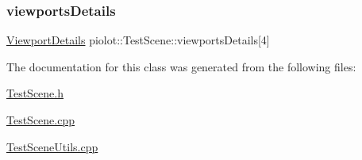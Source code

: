 \mbox{\label{classpiolot_1_1_test_scene_a0cbccb0354c0c68f277c2360cefc9ab7}} 
\subsubsection{\texorpdfstring{viewports\+Details}{viewportsDetails}}
{\footnotesize\ttfamily \mbox{\hyperlink{structpiolot_1_1_viewport_details}{Viewport\+Details}} piolot\+::\+Test\+Scene\+::viewports\+Details\mbox{[}4\mbox{]}\hspace{0.3cm}{\ttfamily [private]}}



The documentation for this class was generated from the following files\+:\begin{DoxyCompactItemize}
\item 
\mbox{\hyperlink{_test_scene_8h}{Test\+Scene.\+h}}\item 
\mbox{\hyperlink{_test_scene_8cpp}{Test\+Scene.\+cpp}}\item 
\mbox{\hyperlink{_test_scene_utils_8cpp}{Test\+Scene\+Utils.\+cpp}}\end{DoxyCompactItemize}
